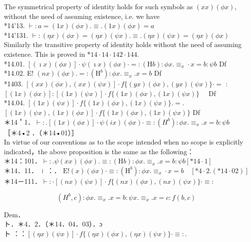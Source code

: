 \documentclass[10pt]{article}
\begin{document}
The symmetrical property of identity holds for such symbols as $(x x)(\phi x)$, without the need of assuming existence, i.e. we have\\
*14'13. $\vdash: a=(1 x)(\phi x) . \equiv .(1 x)(\phi x)=a$\\
*14'131. $\vdash:(\eta x)(\phi x)=(\eta x)(\psi x) . \equiv .(\eta x)(\psi x)=(\eta x)(\phi x)$\\
Similarly the transitive property of identity holds without the need of assuming existence. This is proved in $* 14 \cdot 14 \cdot 142 \cdot 144$.\\
*14.01. $[(\imath x)(\phi x)] \cdot \psi(\imath x)(\phi x) \cdot=:(\mathrm{H} b): \phi x . \equiv_{x} \cdot x=b: \psi b$ Df\\
*14.02. E! $(n x)(\phi x) .=:\left(\mathrm{H}^{b}\right): \phi x . \equiv_{x} . x=b$ Df\\
*1403. $[(x x)(\phi x),(x x)(\psi x)] \cdot f\{(y x)(\phi x),(y x)(\psi x)\} \cdot=$ :\\
$[(1 x)(\phi x)]:[(1 x)(\psi x)] \cdot f\{(1 x)(\phi x),(1 x)(\psi x)\} \quad$ Df\\
*14.04. $[(1 x)(\psi x)] \cdot f\{(1 x)(\phi x),(1 x)(\psi x)\} .=$.\\
$[(1 x)(\psi x),(1 x)(\phi x)] \cdot f\{(1 x)(\phi x),(1 x)(\psi x)\}$ Df\\
＊14＇1．$\vdash: .[(1 x)(\phi x)] \cdot \psi(i x)(\phi x) \cdot \equiv:\left(H^{b}\right): \phi x . \equiv_{x} . x=b: \psi b$\\
［＊4•2 ．（＊14•01）］\\
In virtue of our conventions as to the scope intended when no scope is explicitly indicated，the above proposition is the same as the following：\\
＊14：101．$\vdash: . \psi(x x)(\phi x) . \equiv:(\mathrm{H} b): \phi x . \equiv_{x} . x=b: \psi b[* 14 \cdot 1]$\\
＊14．11． । ：． $\mathrm{E}!(x)(\phi x) \cdot \equiv:\left(\mathrm{H}^{b}\right): \phi x . \equiv_{x} \cdot x=b \quad[* 4 \cdot 2 .(* 14 \cdot 02)]$\\
＊14－111．$\vdash: \cdot[(n x)(\psi x)] \cdot f\{(n x)(\phi x),(n x)(\psi x)\} \cdot \equiv:$

$$
\left(H^{b}, c\right): \phi x . \equiv_{x} . x=b: \psi x . \equiv_{x} . x=c: f(b, c)
$$

Dem．\\
ト．＊4．2．（＊14．04．03）．ɔ\\
ト ：：$[(\eta x)(\psi x)] \cdot f\{(\eta x)(\phi x),(\eta x)(\psi x)\} \cdot \equiv:$.
\end{document}
